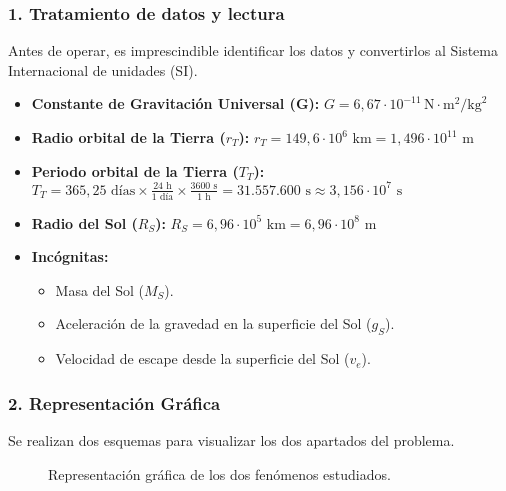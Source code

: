 \subsubsection*{1. Tratamiento de datos y lectura}
Antes de operar, es imprescindible identificar los datos y convertirlos al Sistema Internacional de unidades (SI).
\begin{itemize}
    \item \textbf{Constante de Gravitación Universal (G):} $G = 6,67 \cdot 10^{-11} \, \text{N}\cdot\text{m}^2/\text{kg}^2$
    \item \textbf{Radio orbital de la Tierra ($r_T$):} $r_T = 149,6 \cdot 10^6 \text{ km} = 1,496 \cdot 10^{11} \text{ m}$
    \item \textbf{Periodo orbital de la Tierra ($T_T$):}
    $T_T = 365,25 \text{ días} \times \frac{24 \text{ h}}{1 \text{ día}} \times \frac{3600 \text{ s}}{1 \text{ h}} = 31.557.600 \text{ s} \approx 3,156 \cdot 10^7 \text{ s}$
    \item \textbf{Radio del Sol ($R_S$):} $R_S = 6,96 \cdot 10^5 \text{ km} = 6,96 \cdot 10^8 \text{ m}$
    \item \textbf{Incógnitas:}
    \begin{itemize}
        \item Masa del Sol ($M_S$).
        \item Aceleración de la gravedad en la superficie del Sol ($g_S$).
        \item Velocidad de escape desde la superficie del Sol ($v_e$).
    \end{itemize}
\end{itemize}

\subsubsection*{2. Representación Gráfica}
Se realizan dos esquemas para visualizar los dos apartados del problema.
\begin{figure}[H]
    \centering
    \hfill
    \caption{Representación gráfica de los dos fenómenos estudiados.}
\end{figure}

